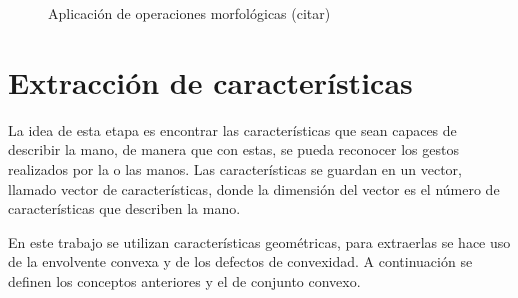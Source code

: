 \begin{figure}
\caption{Aplicación de operaciones morfológicas (citar)} \label{fig:OM}
\end{figure} 



\section{Extracción de características}\label{sec:Convexhull} 

La idea de esta etapa es encontrar las características que sean capaces de describir la mano, de manera que con estas, se pueda reconocer los gestos realizados por la o las manos.  
Las características se guardan en un vector, llamado vector de características, donde la dimensión del vector es el número de características que describen la mano.  

En este trabajo se utilizan características geométricas, para extraerlas se hace uso de la envolvente convexa y de los defectos de convexidad. A continuación se definen los conceptos anteriores y el de conjunto convexo.


